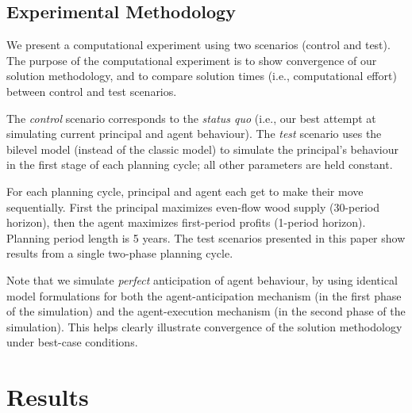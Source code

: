 \subsection{Experimental Methodology}

We present a computational experiment using two scenarios (control and test). 
The purpose of the computational experiment is to show convergence of our solution methodology, and to compare solution times (i.e., computational effort) between control and test scenarios.

The \emph{control} scenario corresponds to the \emph{status quo} (i.e., our best attempt at simulating current principal and agent behaviour).
The \emph{test} scenario uses the bilevel model (instead of the classic model) to simulate the principal's behaviour in the first stage of each planning cycle; all other parameters are held constant. 

For each planning cycle, principal and agent each get to make their move sequentially. 
First the principal maximizes even-flow wood supply (30-period horizon), then the agent maximizes first-period profits (1-period horizon).
Planning period length is 5 years.
The test scenarios presented in this paper show results from a single two-phase planning cycle.

Note that we simulate \emph{perfect} anticipation of agent behaviour, by using identical model formulations for both the agent-anticipation mechanism (in the first phase of the simulation) and the agent-execution mechanism (in the second phase of the simulation).
This helps clearly illustrate convergence of the solution methodology under best-case conditions.




\section{Results}
\label{sec:results2}

